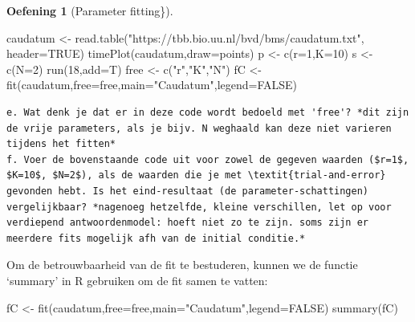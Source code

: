 \documentclass[
  a4paper,
]{scrbook}
\newenvironment{Shaded}{\begin{snugshade}}{\end{snugshade}}
\newcommand{\AttributeTok}[1]{\textcolor[rgb]{0.40,0.45,0.13}{#1}}
\newcommand{\ConstantTok}[1]{\textcolor[rgb]{0.56,0.35,0.01}{#1}}
\newcommand{\DecValTok}[1]{\textcolor[rgb]{0.68,0.00,0.00}{#1}}
\newcommand{\FunctionTok}[1]{\textcolor[rgb]{0.28,0.35,0.67}{#1}}
\newcommand{\NormalTok}[1]{\textcolor[rgb]{0.00,0.23,0.31}{#1}}
\newcommand{\OtherTok}[1]{\textcolor[rgb]{0.00,0.23,0.31}{#1}}
\newcommand{\StringTok}[1]{\textcolor[rgb]{0.13,0.47,0.30}{#1}}
\theoremstyle{definition}
\newtheorem{exercise}{Oefening}[chapter]
\theoremstyle{remark}
\begin{document}
\begin{exercise}[Parameter
fitting\}]
\begin{Shaded}
\begin{Highlighting}[]
\NormalTok{    caudatum }\OtherTok{\textless{}{-}} \FunctionTok{read.table}\NormalTok{(}\StringTok{"https://tbb.bio.uu.nl/bvd/bms/caudatum.txt"}\NormalTok{, }\AttributeTok{header=}\ConstantTok{TRUE}\NormalTok{)}
    \FunctionTok{timePlot}\NormalTok{(caudatum,}\AttributeTok{draw=}\NormalTok{points)}
\NormalTok{    p }\OtherTok{\textless{}{-}} \FunctionTok{c}\NormalTok{(}\AttributeTok{r=}\DecValTok{1}\NormalTok{,}\AttributeTok{K=}\DecValTok{10}\NormalTok{)   }
\NormalTok{    s }\OtherTok{\textless{}{-}} \FunctionTok{c}\NormalTok{(}\AttributeTok{N=}\DecValTok{2}\NormalTok{)}
    \FunctionTok{run}\NormalTok{(}\DecValTok{18}\NormalTok{,}\AttributeTok{add=}\NormalTok{T)}
\NormalTok{    free }\OtherTok{\textless{}{-}} \FunctionTok{c}\NormalTok{(}\StringTok{"r"}\NormalTok{,}\StringTok{"K"}\NormalTok{,}\StringTok{"N"}\NormalTok{)}
\NormalTok{    fC }\OtherTok{\textless{}{-}} \FunctionTok{fit}\NormalTok{(caudatum,}\AttributeTok{free=}\NormalTok{free,}\AttributeTok{main=}\StringTok{"Caudatum"}\NormalTok{,}\AttributeTok{legend=}\ConstantTok{FALSE}\NormalTok{)}
\end{Highlighting}
\end{Shaded}

\begin{verbatim}
e. Wat denk je dat er in deze code wordt bedoeld met 'free'? *dit zijn de vrije parameters, als je bijv. N weghaald kan deze niet varieren tijdens het fitten*
f. Voer de bovenstaande code uit voor zowel de gegeven waarden ($r=1$, $K=10$, $N=2$), als de waarden die je met \textit{trial-and-error} gevonden hebt. Is het eind-resultaat (de parameter-schattingen) vergelijkbaar? *nagenoeg hetzelfde, kleine verschillen, let op voor verdiepend antwoordenmodel: hoeft niet zo te zijn. soms zijn er meerdere fits mogelijk afh van de initial conditie.*
\end{verbatim}

Om de betrouwbaarheid van de fit te bestuderen, kunnen we de functie
`summary' in R gebruiken om de fit samen te vatten:

\begin{Shaded}
\begin{Highlighting}[]
\NormalTok{fC }\OtherTok{\textless{}{-}} \FunctionTok{fit}\NormalTok{(caudatum,}\AttributeTok{free=}\NormalTok{free,}\AttributeTok{main=}\StringTok{"Caudatum"}\NormalTok{,}\AttributeTok{legend=}\ConstantTok{FALSE}\NormalTok{)}
\FunctionTok{summary}\NormalTok{(fC)}
\end{Highlighting}
\end{Shaded}


\end{exercise}
\end{document}
